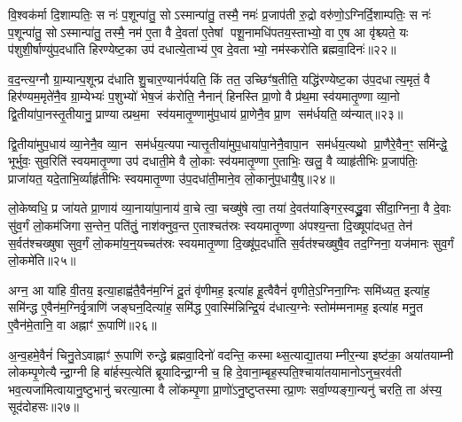 {\anuvakamend[{ओष॑धयः॒ कञ्जु॑होति स्वप॒त्याया॒ष्टाद॑श च॥४॥}]}

वि॒श्वक॑र्मा दि॒शाम्पतिः॒ स नः॑ प॒शून्पा॑तु॒ सोऽस्मान्पा॑तु॒ तस्मै॒ नमः॑ प्र॒जाप॑ती रु॒द्रो वरु॑णो॒ऽग्निर्दि॒शाम्पतिः॒ स नः॑ प॒शून्पा॑तु॒ सोऽस्मान्पा॑तु॒ तस्मै॒ नम॑ ए॒ता वै दे॒वता॑ ए॒तेषां पशू॒नामधि॑पतय॒स्ताभ्यो॒ वा ए॒ष आ वृ॑श्च्यते॒ यः प॑शुशी॒र्\mbox{}षाण्यु॑प॒दधा॑ति हिरण्येष्ट॒का उप॑ दधात्ये॒ताभ्य॑ ए॒व दे॒वताभ्यो॒ नम॑स्करोति ब्रह्मवा॒दिनः॑॥२२॥

व॒द॒न्त्य॒ग्नौ ग्रा॒म्यान्प॒शून्प्र द॑धाति शु॒चार॒ण्यान॑र्पयति॒ किं तत॒ उच्छिꣳ॑ष॒तीति॒ यद्धि॑रण्येष्ट॒का उ॑प॒दधात्य॒मृतं॒ वै हिर॑ण्यम॒मृते॑नै॒व ग्रा॒म्येभ्यः॑ प॒शुभ्यो॑ भेष॒जं क॑रोति॒ नैनान्॑ हिनस्ति प्रा॒णो वै प्र॑थ॒मा स्व॑यमातृ॒ण्णा व्या॒नो द्वि॒तीया॑पा॒नस्तृ॒तीयानु॒ प्राण्यात्प्रथ॒मा स्व॑यमातृ॒ण्णामु॑प॒धाय॑ प्रा॒णेनै॒व प्रा॒ण सम॑र्धयति॒ व्य॑न्यात्॥२३॥

द्वि॒तीया॑मुप॒धाय॑ व्या॒नेनै॒व व्या॒न सम॑र्धय॒त्यपान्यात्तृ॒तीया॑मुप॒धाया॑पा॒नेनै॒वापा॒न सम॑र्धय॒त्यथो प्रा॒णैरे॒वैन॒ꣳ॒ समि॑न्द्धे॒ भूर्भुवः॒ सुव॒रिति॑ स्वयमातृ॒ण्णा उप॑ दधाती॒मे वै लो॒काः स्व॑यमातृ॒ण्णा ए॒ताभिः॒ खलु॒ वै व्याहृ॑तीभिः प्र॒जाप॑तिः॒ प्राजा॑यत॒ यदे॒ताभि॒र्व्याहृ॑तीभिः स्वयमातृ॒ण्णा उ॑प॒दधा॑ती॒माने॒व लो॒कानु॑प॒धायै॒षु॥२४॥

लो॒केष्वधि॒ प्र जा॑यते प्रा॒णाय॑ व्या॒नाया॑पा॒नाय॑ वा॒चे त्वा॒ चख्षु॑षे त्वा॒ तया॑ दे॒वत॑याङ्गिर॒स्वद्ध्रु॒वा सी॑दा॒ग्निना॒ वै दे॒वाः सु॑व॒र्गं लो॒कम॑जिगास॒न्तेन॒ पति॑तुं॒ नाश॑क्नुव॒न्त ए॒ताश्चत॑स्रः स्वयमातृ॒ण्णा अ॑पश्य॒न्ता दि॒ख्षूपा॑दधत॒ तेन॑ स॒र्वत॑श्चख्षुषा सुव॒र्गं लो॒कमा॑य॒न्॒यच्चत॑स्रः स्वयमातृ॒ण्णा दि॒ख्षू॑प॒दधा॑ति स॒र्वत॑श्चख्षुषै॒व तद॒ग्निना॒ यज॑मानः सुव॒र्गं लो॒कमे॑ति॥२५॥

{\anuvakamend[{ब्र॒ह्म॒वा॒दिनो॒ व्य॑न्यादे॒षु यज॑मान॒स्त्रीणि॑ च॥५॥}]}

अग्न॒ आ या॑हि वी॒तय॒ इत्या॒हाह्व॑तै॒वैन॑म॒ग्निं दू॒तं वृ॑णीमह॒ इत्या॑ह हू॒त्वैवैनं॑ वृणीते॒ऽग्निना॒ग्निः समि॑ध्यत॒ इत्या॑ह॒ समि॑न्द्ध ए॒वैन॑म॒ग्निर्वृ॒त्राणि॑ जङ्घन॒दित्या॑ह॒ समि॑द्ध ए॒वास्मि॑न्निन्द्रि॒यं द॑धात्य॒ग्नेः स्तोम॑म्मनामह॒ इत्या॑ह मनु॒त ए॒वैन॑मे॒तानि॒ वा अह्नाꣳ॑ रू॒पाणि॑॥२६॥

अ॒न्व॒हमे॒वैनं॑ चिनु॒तेऽवाह्नाꣳ॑ रू॒पाणि॑ रुन्द्धे ब्रह्मवा॒दिनो॑ वदन्ति॒ कस्माथ्स॒त्याद्या॒तयाम्नीर॒न्या इष्ट॑का॒ अया॑तयाम्नी लोकम्पृ॒णेत्यैन्द्रा॒ग्नी हि बा॑र्\mbox{}हस्प॒त्येति॑ ब्रूयादिन्द्रा॒ग्नी च॒ हि दे॒वाना॒म्बृह॒स्पति॒श्चाया॑तयामानोऽनुच॒रव॑ती भव॒त्यजा॑मित्वायानु॒ष्टुभानु॑ चरत्या॒त्मा वै लो॑कम्पृ॒णा प्रा॒णो॑ऽनु॒ष्टुप्तस्मात्प्रा॒णः सर्वा॒ण्यङ्गा॒न्यनु॑ चरति॒ ता अ॑स्य॒ सूद॑दोहसः॥२७॥

